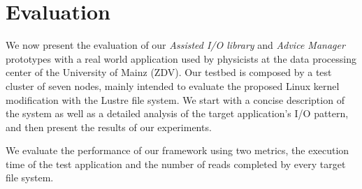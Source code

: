 \section{Evaluation}
\label{sec: mercury_evaluation}
We now present the evaluation of our \textit{Assisted I/O library} and \textit{Advice Manager} prototypes with a real world application used by physicists at the data processing center of the University of Mainz (ZDV). Our testbed is composed by %
a test cluster of seven nodes, mainly intended to evaluate the proposed Linux kernel modification with the Lustre file system. %
We start with a concise description of the %
system as well as a detailed analysis of the target application's I/O pattern, and then present the results of our experiments. 

We evaluate the performance of our framework using two metrics, the execution time of the test application and the number of reads completed by every target file system. %

